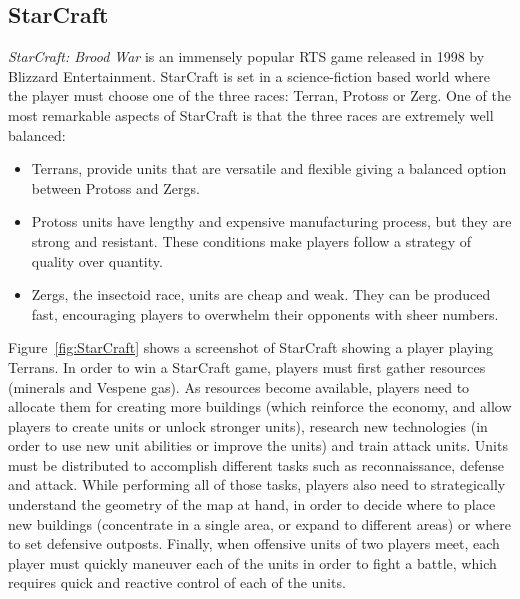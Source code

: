 \documentclass[journal]{IEEEtran}
\begin{document}
\subsection{StarCraft}\label{subsec:StarCraft}

{\em StarCraft: Brood War} is an immensely popular RTS game released in 1998 by Blizzard Entertainment. StarCraft is set in a science-fiction based world where the player must choose one of the three races: Terran, Protoss or Zerg. One of the most remarkable aspects of StarCraft is that the three races are extremely well balanced:

\begin{itemize}
	\item Terrans, provide units that are versatile and flexible giving a balanced option between Protoss and Zergs.
	\item Protoss units have lengthy and expensive manufacturing process, but they are strong and resistant. These conditions make players follow a strategy of quality over quantity.
	\item Zergs, the insectoid race, units are cheap and weak. They can be produced fast, encouraging players to overwhelm their opponents with sheer numbers.
\end{itemize}


Figure~\ref{fig:StarCraft} shows a screenshot of StarCraft showing a player playing Terrans. In order to win a StarCraft game, players must first gather resources (minerals and Vespene gas). As resources become available, players need to allocate them for creating more buildings (which reinforce the economy, and allow players to create units or unlock stronger units), research new technologies (in order to use new unit abilities or improve the units) and train attack units. Units must be distributed to accomplish different tasks such as reconnaissance, defense and attack. While performing all of those tasks, players also need to strategically understand the geometry of the map at hand, in order to decide where to place new buildings (concentrate in a single area, or expand to different areas) or where to set defensive outposts. Finally, when offensive units of two players meet, each player must quickly maneuver each of the units in order to fight a battle, which requires quick and reactive control of each of the units.
\end{document}
